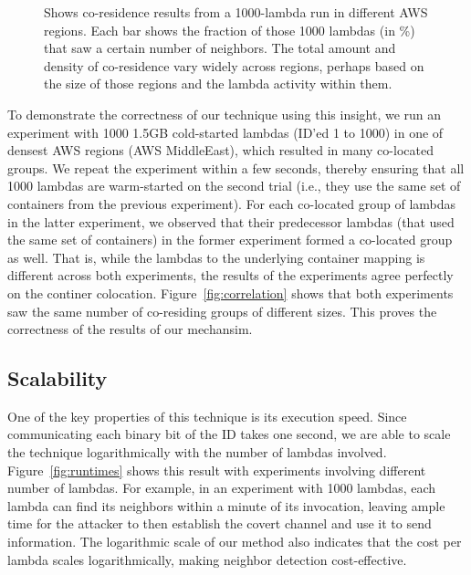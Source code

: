 \begin{figure}[!t]
\begin{subfigure}{.33\textwidth}
  \end{subfigure}
  \caption{Shows co-residence results from a 1000-lambda run in different AWS regions. Each bar shows the fraction 
  of those 1000 lambdas (in \%) that saw a certain number of neighbors. The total amount and density of co-residence 
  vary widely across regions, perhaps based on the size of those regions and the lambda activity within them. }
  \label{fig:awsregions}
  \end{figure}

To demonstrate the correctness of our technique using this insight, 
we run an experiment with 1000 1.5GB cold-started
lambdas (ID'ed 1 to 1000) in one of densest AWS regions (AWS MiddleEast), which
resulted in many co-located groups.  We repeat the experiment within a few
seconds, thereby ensuring that all 1000 lambdas are warm-started on the second
trial (i.e., they use the same set of containers from the previous experiment).
For each co-located group of lambdas in the latter experiment, we observed that 
their predecessor lambdas (that used the same set of containers) in the former 
experiment formed a co-located group as well. 
That is, while the lambdas to the underlying container mapping is different across 
both experiments, the results of the experiments agree perfectly on the continer 
colocation. Figure~\ref{fig:correlation} shows that both experiments saw
the same number of co-residing groups of different sizes. 
This proves the correctness of the results of our mechansim.

\subsection{Scalability}
One of the key properties of this technique is its execution speed. Since
communicating each binary bit of the ID takes one second, we are able to scale
the technique logarithmically with the number of lambdas involved.
Figure~\ref{fig:runtimes} shows this result with experiments involving
different number of lambdas. For example, in an experiment with 1000 lambdas,
each lambda can find its neighbors within a minute of its invocation, leaving
ample time for the attacker to then establish the covert channel and use it to 
send information. The logarithmic scale of our method also indicates that the 
cost per lambda scales logarithmically, making neighbor detection cost-effective.





